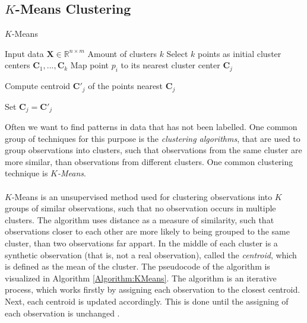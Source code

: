 \documentclass[./main.tex]{subfiles}
\begin{document}
\subsection{$K$-Means Clustering}\label{subsec:K_means}
\begin{algorithm}[htbp]
    \caption{$K$-Means \cite{DS_manual}}
    \begin{algorithmic}[1]
        \Require Input data $\bm{X} \in \mathbb{R}^{n \times m}$
        \Require Amount of clusters $k$
        \State Select $k$ points as initial cluster centers $\bm{C}_1, ..., \bm{C}_k$
                \State Map point $p_i$ to its nearest cluster center $\bm{C}_j$
            \EndFor

                \State Compute centroid $\bm{C}'_j$ of the points nearest $\bm{C}_j$
            \EndFor

                \State Set $\bm{C}_j = \bm{C}'_j$
            \EndFor
        \EndWhile
    \end{algorithmic}
    \label{Algorithm:KMeans}
\end{algorithm}
\noindent Often we want to find patterns in data that has not been labelled. One common group of techniques for this purpose is the \textit{clustering algorithms}, that are used to group observations into clusters, such that observations from the same cluster are more similar, than observations from different clusters. One common clustering technique is $K$\textit{-Means}.
\\
\\
$K$-Means is an unsupervised method used for clustering observations into $K$ groups of similar observations, such that no observation occurs in multiple clusters. The algorithm uses distance as a measure of similarity, such that observations closer to each other are more likely to being grouped to the same cluster, than two observations far appart. In the middle of each cluster is a synthetic observation (that is, not a real observation), called the \textit{centroid}, which is defined as the mean of the cluster. The pseudocode of the algorithm is visualized in Algorithm \ref{Algorithm:KMeans}. The algorithm is an iterative process, which works firstly by assigning each observation to the closest centroid. Next, each centroid is updated accordingly. This is done until the assigning of each observation is unchanged \cite{MAD_book}.
\\
\\
\end{document}

